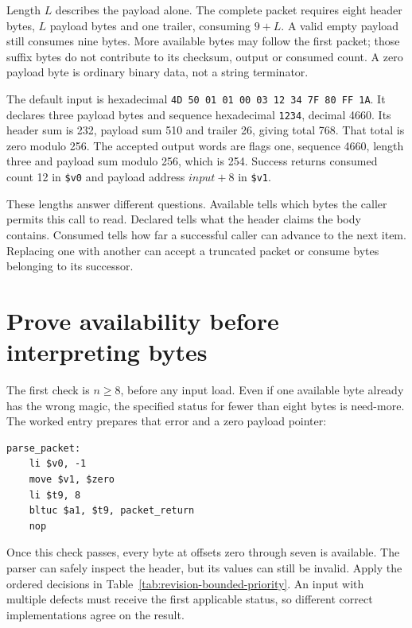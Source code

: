 Length $L$ describes the payload alone. The complete packet requires eight header
bytes, $L$ payload bytes and one trailer, consuming $9+L$. A valid empty payload
still consumes nine bytes. More available bytes may follow the first packet;
those suffix bytes do not contribute to its checksum, output or consumed count.
A zero payload byte is ordinary binary data, not a string terminator.

The default input is hexadecimal
\texttt{4D 50 01 01 00 03 12 34 7F 80 FF 1A}. It declares three payload bytes
and sequence hexadecimal \texttt{1234}, decimal 4660. Its header sum is 232,
payload sum 510 and trailer 26, giving total 768. That total is zero modulo 256.
The accepted output words are flags one, sequence 4660, length three and payload
sum modulo 256, which is 254. Success returns consumed count 12 in
\texttt{\$v0} and payload address $input+8$ in \texttt{\$v1}.



These lengths answer different questions. Available tells which bytes the caller
permits this call to read. Declared tells what the header claims the body contains.
Consumed tells how far a successful caller can advance to the next item. Replacing
one with another can accept a truncated packet or consume bytes belonging to its
successor.

\section{Prove availability before interpreting bytes}

The first check is $n\geq8$, before any input load. Even if one available byte
already has the wrong magic, the specified status for fewer than eight bytes is
need-more. The worked entry prepares that error and a zero payload pointer:

\noindent\begin{minipage}{\linewidth}
  \begin{verbatim}
parse_packet:
    li $v0, -1
    move $v1, $zero
    li $t9, 8
    bltuc $a1, $t9, packet_return
    nop
\end{verbatim}
\end{minipage}

Once this check passes, every byte at offsets zero through seven is available.
The parser can safely inspect the header, but its values can still be invalid.
Apply the ordered decisions in Table~\ref{tab:revision-bounded-priority}. An
input with multiple defects must receive the first applicable status, so different
correct implementations agree on the result.

